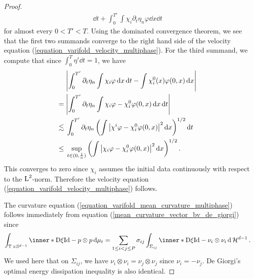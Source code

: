 \begin{proof}
\begin{align*}
		\dd{ t }
		+
		\int_{ 0 }^{ T' }
		\int
		\chi_{ i }
		\partial_{ t } \eta_{ n }
		\varphi
		\dd{ x }
		\dd{ t }
	\end{align*}
	for almost every $ 0 < T' < T $.
	Using the dominated convergence theorem, we see that the first two summands 
	converge to the right hand side of the velocity equation 
	(\ref{equation_varifold_velocity_multiphase}). For the third summand, we 
	compute that since $ \int_{ 0 }^{ T } \eta' \dd{ t } = 1 $, we have
	\begin{align*}
		& \abs{
			\int_{ 0 }^{ T' }
			\partial_{ t } \eta_{ n }
			\int
			\chi_{ i }
			\varphi
			\dd{ x }
			\dd{t}
			-
			\int
			\chi^{ 0 }_{ i } ( x )
			\varphi ( 0 , x )
			\dd{ x }
		}
		\\
		={} &
		\abs{ 
			\int_{ 0 }^{ T' }
			\partial_{ t } \eta_{ n }
			\int
			\chi_{ i }
			\varphi
			-
			\chi^{ 0 }_{ i }
			\varphi ( 0 , x )
			\dd{ x }
			\dd{ t }
		}
		\\
		\lesssim{} &
		\int_{ 0 }^{ T' } 
		\partial_{ t } \eta_{ n }
		\left(
		\int
		\abs{ \chi^{ i } \varphi - \chi^{ 0 }_{ i } \varphi ( 0 , x 
			) 
		}^{ 2 }
		\dd{ x }
		\right)^{ 1/2 }
		\dd{ t }
		\\
		\leq {} &
		\sup_{ t \in ( 0, \frac{ 1 }{ n } ) }
			\left(
				\int
					\abs{ \chi_{ i } \varphi - \chi_{ i }^{ 0 } \varphi ( 0 , x 
					) }^{ 2 }
				\dd{ x }
			\right)^{ 1/2 }.
	\end{align*}
	This converges to zero since $ \chi_{ i } $ assumes the initial data 
	continuously with respect to the $ \operatorname{L}^{ 2 } $-norm. Therefore the velocity 
	equation 
	(\ref{equation_varifold_velocity_multiphase}) follows.
	
	The curvature equation (\ref{equation_varifold_mean_curvature_multiphase}) 
	follows 
	immediately from equation (\ref{mean_curvature_vector_bv_de_giorgi})
	since
	\begin{equation*}
		\int_{ \flattorus \times \mathbb{ S }^{ d - 1 } }
		\inner*{ \diff \xi }{ \mathrm{Id} - p \otimes p }
		\dd{ \mu_{ t } }
		=
		\sum_{ 1 \leq i < j \leq P }
		\sigma_{ i j }
		\int_{ \Sigma_{ i j } }
		\inner*{ \diff \xi }{\mathrm{Id} - \nu_{i } \otimes \nu_{ i } }
		\dd{ \hm^{ d - 1 } }.
	\end{equation*}
	We used here that on $ \Sigma_{ i j } $, 
	we have $ \nu_{i } \otimes \nu_{ i } = \nu_{ j } \otimes \nu_{ j } $
	since $ \nu_{ i } = - \nu_{j } $.
	De Giorgi's optimal energy dissipation inequality is also identical.
	

\end{proof}
